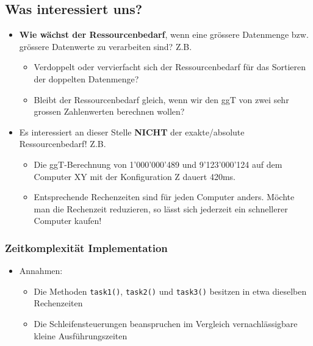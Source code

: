 \documentclass[10pt,a4paper]{article}
\begin{document}
\subsection*{Was interessiert uns?}
\begin{itemize}[noitemsep,topsep=0pt,leftmargin=*]
    \item \textbf{Wie wächst der Ressourcenbedarf}, wenn eine grössere Datenmenge bzw. grössere Datenwerte zu verarbeiten sind? Z.B.
    \begin{itemize}[noitemsep,topsep=0pt,leftmargin=*]
        \item Verdoppelt oder vervierfacht sich der Ressourcenbedarf für das Sortieren der doppelten Datenmenge?
        \item Bleibt der Ressourcenbedarf gleich, wenn wir den ggT von zwei sehr grossen Zahlenwerten berechnen wollen?
    \end{itemize}
    \item Es interessiert an dieser Stelle \textbf{NICHT} der exakte/absolute Ressourcenbedarf! Z.B.
    \begin{itemize}[noitemsep,topsep=0pt,leftmargin=*]
        \item Die ggT-Berechnung von 1'000'000'489 und 9'123'000'124 auf dem Computer XY mit der Konfiguration Z dauert 420ms.
        \item Entsprechende Rechenzeiten sind für jeden Computer anders. Möchte man die Rechenzeit reduzieren, so lässt sich jederzeit ein schnellerer Computer kaufen!
    \end{itemize}
\end{itemize}

\subsubsection{Zeitkomplexität Implementation}
\begin{itemize}[noitemsep,topsep=0pt,leftmargin=*]
    \item Annahmen:
    \begin{itemize}[noitemsep,topsep=0pt,leftmargin=*]
        \item Die Methoden \texttt{task1()}, \texttt{task2()} und \texttt{task3()} besitzen in etwa dieselben Rechenzeiten
        \item Die Schleifensteuerungen beanspruchen im Vergleich vernachlässigbare kleine Ausführungszeiten
    \end{itemize}
\end{itemize}
\end{document}
